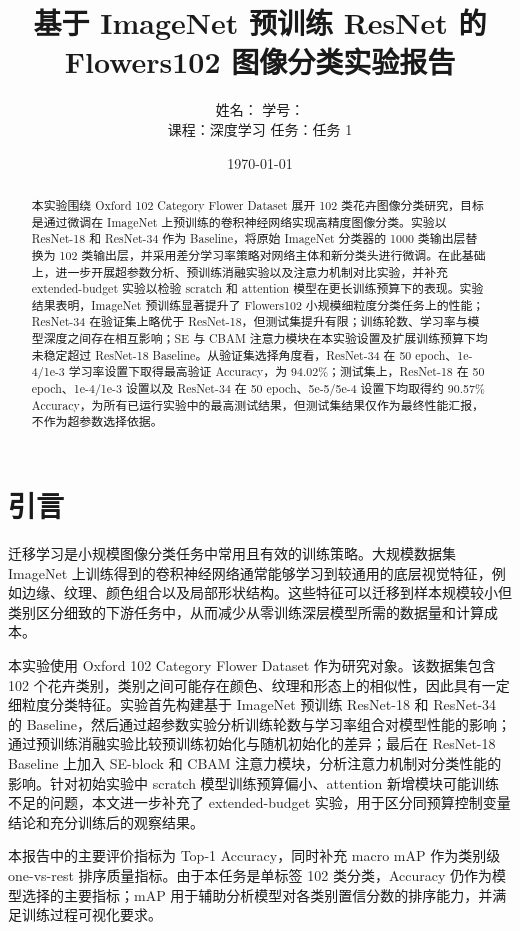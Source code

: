\documentclass[UTF8]{ctexart}
\title{基于 ImageNet 预训练 ResNet 的 Flowers102 图像分类实验报告}
\author{姓名：\underline{\hspace{3cm}} \quad 学号：\underline{\hspace{3cm}}\\课程：深度学习 \quad 任务：任务 1}
\date{\today}
\begin{document}
\maketitle

\begin{abstract}
本实验围绕 Oxford 102 Category Flower Dataset 展开 102 类花卉图像分类研究，目标是通过微调在 ImageNet 上预训练的卷积神经网络实现高精度图像分类。实验以 ResNet-18 和 ResNet-34 作为 Baseline，将原始 ImageNet 分类器的 1000 类输出层替换为 102 类输出层，并采用差分学习率策略对网络主体和新分类头进行微调。在此基础上，进一步开展超参数分析、预训练消融实验以及注意力机制对比实验，并补充 extended-budget 实验以检验 scratch 和 attention 模型在更长训练预算下的表现。实验结果表明，ImageNet 预训练显著提升了 Flowers102 小规模细粒度分类任务上的性能；ResNet-34 在验证集上略优于 ResNet-18，但测试集提升有限；训练轮数、学习率与模型深度之间存在相互影响；SE 与 CBAM 注意力模块在本实验设置及扩展训练预算下均未稳定超过 ResNet-18 Baseline。从验证集选择角度看，ResNet-34 在 50 epoch、1e-4/1e-3 学习率设置下取得最高验证 Accuracy，为 94.02\%；测试集上，ResNet-18 在 50 epoch、1e-4/1e-3 设置以及 ResNet-34 在 50 epoch、5e-5/5e-4 设置下均取得约 90.57\% Accuracy，为所有已运行实验中的最高测试结果，但测试集结果仅作为最终性能汇报，不作为超参数选择依据。
\end{abstract}

\section{引言}
迁移学习是小规模图像分类任务中常用且有效的训练策略。大规模数据集 ImageNet 上训练得到的卷积神经网络通常能够学习到较通用的底层视觉特征，例如边缘、纹理、颜色组合以及局部形状结构。这些特征可以迁移到样本规模较小但类别区分细致的下游任务中，从而减少从零训练深层模型所需的数据量和计算成本。

本实验使用 Oxford 102 Category Flower Dataset 作为研究对象。该数据集包含 102 个花卉类别，类别之间可能存在颜色、纹理和形态上的相似性，因此具有一定细粒度分类特征。实验首先构建基于 ImageNet 预训练 ResNet-18 和 ResNet-34 的 Baseline，然后通过超参数实验分析训练轮数与学习率组合对模型性能的影响；通过预训练消融实验比较预训练初始化与随机初始化的差异；最后在 ResNet-18 Baseline 上加入 SE-block 和 CBAM 注意力模块，分析注意力机制对分类性能的影响。针对初始实验中 scratch 模型训练预算偏小、attention 新增模块可能训练不足的问题，本文进一步补充了 extended-budget 实验，用于区分同预算控制变量结论和充分训练后的观察结果。

本报告中的主要评价指标为 Top-1 Accuracy，同时补充 macro mAP 作为类别级 one-vs-rest 排序质量指标。由于本任务是单标签 102 类分类，Accuracy 仍作为模型选择的主要指标；mAP 用于辅助分析模型对各类别置信分数的排序能力，并满足训练过程可视化要求。
\end{document}
